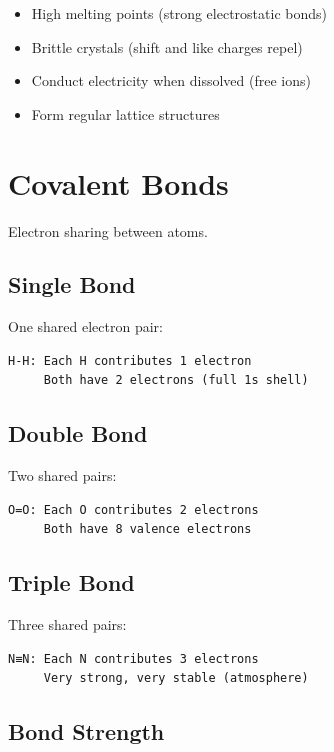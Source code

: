 \documentclass[
  11pt,
  letterpaper,
  twoside,
  openright]{book}
\providecommand{\tightlist}{%
  \setlength{\itemsep}{0pt}\setlength{\parskip}{0pt}}
\begin{document}
\begin{itemize}
\tightlist
\item
  High melting points (strong electrostatic bonds)
\item
  Brittle crystals (shift and like charges repel)
\item
  Conduct electricity when dissolved (free ions)
\item
  Form regular lattice structures
\end{itemize}

\section{Covalent Bonds}\label{covalent-bonds}

Electron sharing between atoms.

\subsection{Single Bond}\label{single-bond}

One shared electron pair:

\begin{verbatim}
H-H: Each H contributes 1 electron
     Both have 2 electrons (full 1s shell)
\end{verbatim}

\subsection{Double Bond}\label{double-bond}

Two shared pairs:

\begin{verbatim}
O=O: Each O contributes 2 electrons
     Both have 8 valence electrons
\end{verbatim}

\subsection{Triple Bond}\label{triple-bond}

Three shared pairs:

\begin{verbatim}
N≡N: Each N contributes 3 electrons
     Very strong, very stable (atmosphere)
\end{verbatim}

\subsection{Bond Strength}\label{bond-strength}
\end{document}

